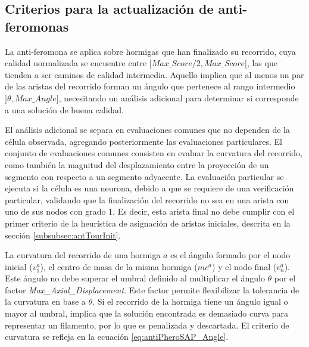 

\subsection{Criterios para la actualizaci\'on de anti-feromonas}

La anti-feromona se aplica sobre hormigas que han finalizado su recorrido, cuya calidad normalizada se encuentre entre $[Max\_Score/2, Max\_Score[$, las que tienden a ser caminos de calidad intermedia. Aquello implica que al menos un par de las aristas del recorrido forman un \'angulo que pertenece al rango intermedio $]\theta, Max\_Angle]$, necesitando un an\'alisis adicional para determinar si corresponde a una soluci\'on de buena calidad. 

El an\'alisis adicional se separa en evaluaciones comunes que no dependen de la c\'elula observada, agregando posteriormente las evaluaciones particulares. El conjunto de evaluaciones comunes consisten en evaluar la curvatura del recorrido, como tambi\'en la magnitud del desplazamiento entre la proyecci\'on de un segmento con respecto a un segmento adyacente. La evaluaci\'on particular se ejecuta si la c\'elula es una neurona, debido a que se requiere de una verificaci\'on particular, validando que la finalizaci\'on del recorrido no sea en una arista con uno de sus nodos con grado 1. Es decir, esta arista final no debe cumplir con el primer criterio de la heur\'istica de asignaci\'on de aristas iniciales, descrita en la secci\'on \ref{subsubsec:antTourInit}.


La curvatura del recorrido de una hormiga $a$ es el \'angulo formado por el nodo inicial ($v^{a}_1$), el centro de masa de la misma hormiga ($mc^{a}$) y el nodo final ($v^{a}_n$). Este \'angulo no debe superar el umbral definido al multiplicar el \'angulo $\theta$ por el factor {\it Max\_Axial\_Displacement}. Este factor permite flexibilizar la tolerancia de la curvatura en base a $\theta$. Si el recorrido de la hormiga tiene un \'angulo igual o mayor al umbral, implica que la soluci\'on encontrada es demasiado curva para representar un filamento, por lo que es penalizada y descartada. El criterio de curvatura se refleja en la ecuaci\'on \eqref{eq:antiPheroSAP_Angle}.

